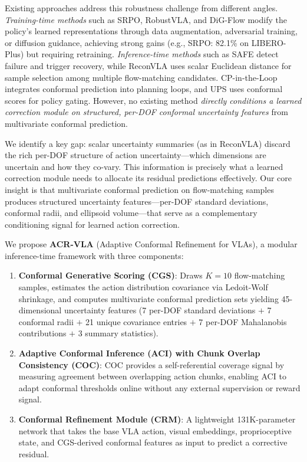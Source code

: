 \documentclass[10pt,twocolumn]{article}
\begin{document}
Existing approaches address this robustness challenge from different angles.
\emph{Training-time methods} such as SRPO, RobustVLA, and DiG-Flow modify the policy's learned representations through data augmentation, adversarial training, or diffusion guidance, achieving strong gains (e.g., SRPO: 82.1\% on LIBERO-Plus) but requiring retraining.
\emph{Inference-time methods} such as SAFE detect failure and trigger recovery, while ReconVLA uses scalar Euclidean distance for sample selection among multiple flow-matching candidates.
CP-in-the-Loop integrates conformal prediction into planning loops, and UPS uses conformal scores for policy gating.
However, no existing method \emph{directly conditions a learned correction module on structured, per-DOF conformal uncertainty features} from multivariate conformal prediction.

We identify a key gap: scalar uncertainty summaries (as in ReconVLA) discard the rich per-DOF structure of action uncertainty---which dimensions are uncertain and how they co-vary.
This information is precisely what a learned correction module needs to allocate its residual predictions effectively.
Our core insight is that multivariate conformal prediction on flow-matching samples produces structured uncertainty features---per-DOF standard deviations, conformal radii, and ellipsoid volume---that serve as a complementary conditioning signal for learned action correction.

We propose \textbf{ACR-VLA} (Adaptive Conformal Refinement for VLAs), a modular inference-time framework with three components:
\begin{enumerate}
    \item \textbf{Conformal Generative Scoring (CGS)}: Draws $K{=}10$ flow-matching samples, estimates the action distribution covariance via Ledoit-Wolf shrinkage, and computes multivariate conformal prediction sets yielding 45-dimensional uncertainty features (7 per-DOF standard deviations $+$ 7 conformal radii $+$ 21 unique covariance entries $+$ 7 per-DOF Mahalanobis contributions $+$ 3 summary statistics).
    \item \textbf{Adaptive Conformal Inference (ACI) with Chunk Overlap Consistency (COC)}: COC provides a self-referential coverage signal by measuring agreement between overlapping action chunks, enabling ACI to adapt conformal thresholds online without any external supervision or reward signal.
    \item \textbf{Conformal Refinement Module (CRM)}: A lightweight 131K-parameter network that takes the base VLA action, visual embeddings, proprioceptive state, and CGS-derived conformal features as input to predict a corrective residual.
\end{enumerate}
\end{document}
